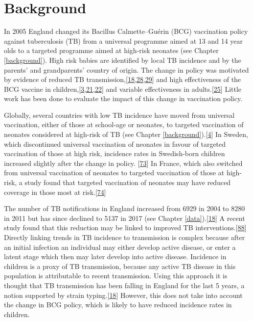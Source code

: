 \documentclass[11pt,twoside]{bristolthesis}
\begin{document}
  \hypertarget{background-5}{%
  \section{Background}\label{background-5}}
  
  In 2005 England changed its Bacillus Calmette--Guérin (BCG) vaccination policy against tuberculosis (TB) from a universal programme aimed at 13 and 14 year olds to a targeted programme aimed at high-risk neonates (see Chapter \ref{background}). High risk babies are identified by local TB incidence and by the parents' and grandparents' country of origin. The change in policy was motivated by evidence of reduced TB transmission,{[}\protect\hyperlink{ref-PHE2016a}{18},\protect\hyperlink{ref-Fine2005a}{28},\protect\hyperlink{ref-Teo2006}{29}{]} and high effectiveness of the BCG vaccine in children,{[}\protect\hyperlink{ref-Roy2014}{3},\protect\hyperlink{ref-Rodrigues1993}{21},\protect\hyperlink{ref-Colditz1994}{22}{]} and variable effectiveness in adults.{[}\protect\hyperlink{ref-Zwerling2011}{25}{]} Little work has been done to evaluate the impact of this change in vaccination policy.
  
  Globally, several countries with low TB incidence have moved from universal vaccination, either of those at school-age or neonates, to targeted vaccination of neonates considered at high-risk of TB (see Chapter \ref{background}).{[}\protect\hyperlink{ref-Zwerling2011a}{4}{]} In Sweden, which discontinued universal vaccination of neonates in favour of targeted vaccination of those at high risk, incidence rates in Swedish-born children increased slightly after the change in policy. {[}\protect\hyperlink{ref-Romanus1992}{73}{]} In France, which also switched from universal vaccination of neonates to targeted vaccination of those at high-risk, a study found that targeted vaccination of neonates may have reduced coverage in those most at risk.{[}\protect\hyperlink{ref-Guthmann2011}{74}{]}
  
  The number of TB notifications in England increased from 6929 in 2004 to 8280 in 2011 but has since declined to 5137 in 2017 (see Chapter \ref{data}).{[}\protect\hyperlink{ref-PHE2016a}{18}{]} A recent study found that this reduction may be linked to improved TB interventions.{[}\protect\hyperlink{ref-Thomas2018}{88}{]} Directly linking trends in TB incidence to transmission is complex because after an initial infection an individual may either develop active disease, or enter a latent stage which then may later develop into active disease. Incidence in children is a proxy of TB transmission, because any active TB disease in this population is attributable to recent transmission. Using this approach it is thought that TB transmission has been falling in England for the last 5 years, a notion supported by strain typing.{[}\protect\hyperlink{ref-PHE2016a}{18}{]} However, this does not take into account the change in BCG policy, which is likely to have reduced incidence rates in children.
  
\end{document}
